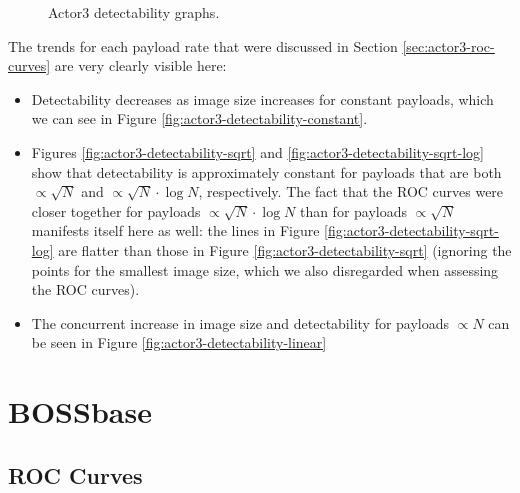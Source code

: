 \documentclass[11pt,a4paper,twoside,openright]{report}
\begin{document}
\begin{figure}[htbp]
    \caption{Actor3 detectability graphs.}
    \label{fig:actor3-detectability-graphs}
\end{figure}

The trends for each payload rate that were discussed in Section \ref{sec:actor3-roc-curves} are very clearly visible here:
\begin{itemize}
	\item Detectability decreases as image size increases for constant payloads, which we can see in Figure \ref{fig:actor3-detectability-constant}.
	\item Figures \ref{fig:actor3-detectability-sqrt} and \ref{fig:actor3-detectability-sqrt-log} show that detectability is approximately constant for payloads that are both $\propto \sqrt{N}$ and $\propto \sqrt{N} \cdot \log{N}$, respectively. The fact that the ROC curves were closer together for payloads $\propto \sqrt{N} \cdot \log{N}$ than for payloads $\propto \sqrt{N}$ manifests itself here as well: the lines in Figure \ref{fig:actor3-detectability-sqrt-log} are flatter than those in Figure \ref{fig:actor3-detectability-sqrt} (ignoring the points for the smallest image size, which we also disregarded when assessing the ROC curves).
	\item The concurrent increase in image size and detectability for payloads $\propto N$ can be seen in Figure \ref{fig:actor3-detectability-linear}
\end{itemize}


\section{BOSSbase} \label{sec:bossbase-results}

\subsection{ROC Curves} \label{sec:bossbase-roc-curves}
\end{document}
